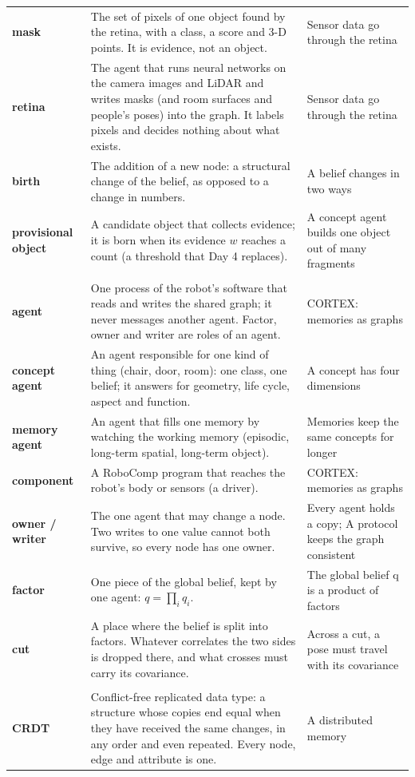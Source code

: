 \documentclass[11pt]{article}
\begin{document}
\begin{longtable}{@{}>{\raggedright\bfseries}p{2.8cm} p{8.9cm} >{\raggedright\arraybackslash}p{4.2cm}@{}}
mask & The set of pixels of one object found by the retina, with a class, a score and 3-D points. It is evidence, not an object. & Sensor data go through the retina\\
retina & The agent that runs neural networks on the camera images and LiDAR and writes masks (and room surfaces and people's poses) into the graph. It labels pixels and decides nothing about what exists. & Sensor data go through the retina\\
birth & The addition of a new node: a structural change of the belief, as opposed to a change in numbers. & A belief changes in two ways\\
provisional object & A candidate object that collects evidence; it is born when its evidence $w$ reaches a count (a threshold that Day 4 replaces). & A concept agent builds one object out of many fragments\\
\midrule
\multicolumn{3}{@{}l}{\emph{Agents}}\\
agent & One process of the robot's software that reads and writes the shared graph; it never messages another agent. Factor, owner and writer are roles of an agent. & CORTEX: memories as graphs\\
concept agent & An agent responsible for one kind of thing (chair, door, room): one class, one belief; it answers for geometry, life cycle, aspect and function. & A concept has four dimensions\\
memory agent & An agent that fills one memory by watching the working memory (episodic, long-term spatial, long-term object). & Memories keep the same concepts for longer\\
component & A RoboComp program that reaches the robot's body or sensors (a driver). & CORTEX: memories as graphs\\
owner / writer & The one agent that may change a node. Two writes to one value cannot both survive, so every node has one owner. & Every agent holds a copy; A protocol keeps the graph consistent\\
factor & One piece of the global belief, kept by one agent: $q=\prod_i q_i$. & The global belief q is a product of factors\\
cut & A place where the belief is split into factors. Whatever correlates the two sides is dropped there, and what crosses must carry its covariance. & Across a cut, a pose must travel with its covariance\\
\midrule
\multicolumn{3}{@{}l}{\emph{Distribution and protocol}}\\
CRDT & Conflict-free replicated data type: a structure whose copies end equal when they have received the same changes, in any order and even repeated. Every node, edge and attribute is one. & A distributed memory\\

\end{longtable}
\end{document}
